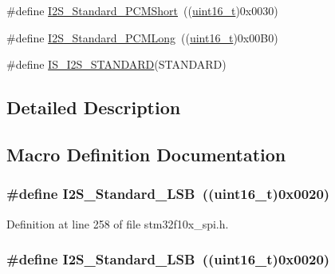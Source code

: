 \begin{DoxyCompactItemize}
\item 
\#define \hyperlink{group___i2_s___standard_gaaf59e587048ff632037dfc9875ab4c7b}{I2\+S\+\_\+\+Standard\+\_\+\+P\+C\+M\+Short}~((\hyperlink{_p_e___types_8h_a1f1825b69244eb3ad2c7165ddc99c956}{uint16\+\_\+t})0x0030)
\item 
\#define \hyperlink{group___i2_s___standard_gaf79cb88702059506d876dbd776d7a136}{I2\+S\+\_\+\+Standard\+\_\+\+P\+C\+M\+Long}~((\hyperlink{_p_e___types_8h_a1f1825b69244eb3ad2c7165ddc99c956}{uint16\+\_\+t})0x00\+B0)
\item 
\#define \hyperlink{group___i2_s___standard_ga826b9ddb34520b8fa64c2b65c9bfd528}{I\+S\+\_\+\+I2\+S\+\_\+\+S\+T\+A\+N\+D\+A\+RD}(S\+T\+A\+N\+D\+A\+RD)
\end{DoxyCompactItemize}


\subsection{Detailed Description}


\subsection{Macro Definition Documentation}
\subsubsection[{\texorpdfstring{I2\+S\+\_\+\+Standard\+\_\+\+L\+SB}{I2S_Standard_LSB}}]{\setlength{\rightskip}{0pt plus 5cm}\#define I2\+S\+\_\+\+Standard\+\_\+\+L\+SB~(({\bf uint16\+\_\+t})0x0020)}\hypertarget{group___i2_s___standard_ga88bc9001a13b95a0844d81fea2080df6}{}\label{group___i2_s___standard_ga88bc9001a13b95a0844d81fea2080df6}


Definition at line 258 of file stm32f10x\+\_\+spi.\+h.

\subsubsection[{\texorpdfstring{I2\+S\+\_\+\+Standard\+\_\+\+L\+SB}{I2S_Standard_LSB}}]{\setlength{\rightskip}{0pt plus 5cm}\#define I2\+S\+\_\+\+Standard\+\_\+\+L\+SB~(({\bf uint16\+\_\+t})0x0020)}\hypertarget{group___i2_s___standard_ga88bc9001a13b95a0844d81fea2080df6}{}\label{group___i2_s___standard_ga88bc9001a13b95a0844d81fea2080df6}


